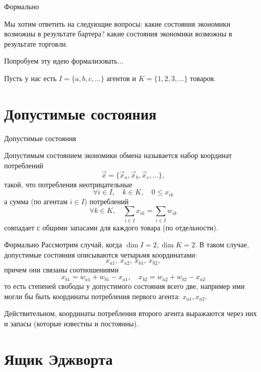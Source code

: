 \documentclass{beamer}
\begin{document}
\begin{frame}{Формально}

Мы хотим ответить на следующие вопросы: какие состояния экономики возможны в результате бартера? какие состояния экономики возможны в результате торговли.

Попробуем эту идею формализовать...

Пусть у нас есть $I = \{a,b,c, \ldots \}$ агентов и $K = \{1,2,3, \ldots \}$ товаров.
\end{frame}

\section{Допустимые состояния}
\begin{frame}{Допустимые состояния}

\alert{Допустимым состоянием} экономики обмена называется набор координат потреблений
$$ \vec x = \{ \vec x_a, \vec x_b, \vec x_c, \ldots \},$$
такой, что потребления неотрицательные
$$\forall i \in I, \quad k \in K, \quad 0 \leqslant x_{ik}$$
а сумма (по агентам $i \in I$) потреблений 
$$\forall k \in K, \quad \sum_{i \in I} x_{ik} = \sum_{i \in I} w_{ik}$$
совпадает с общими запасами для каждого товара (по отдельности).
\end{frame}

\begin{frame}{Формально}
Рассмотрим случай, когда $\dim I = 2, \dim K = 2$. В таком случае, допустимые состояния описываются четырьмя координатами:
$$ x_{a1}, \ x_{a2}, \ x_{b1}, \ x_{b2},$$
причем они связаны соотношениями
$$ x_{b1} = w_{a1} + w_{b1} - x_{a1}, \quad x_{b2} = w_{a2} + w_{b2} - x_{a2}$$
то есть \alert{степеней свободы} у допустимого состояния всего две, например ими могли бы быть координаты потребления первого агента: $x_{a1}, x_{a2}$. 

Действительном, координаты потребления второго агента выражаются через них и запасы (которые известны и постоянны).
\end{frame}

\section{Ящик Эджворта}
\end{document}
